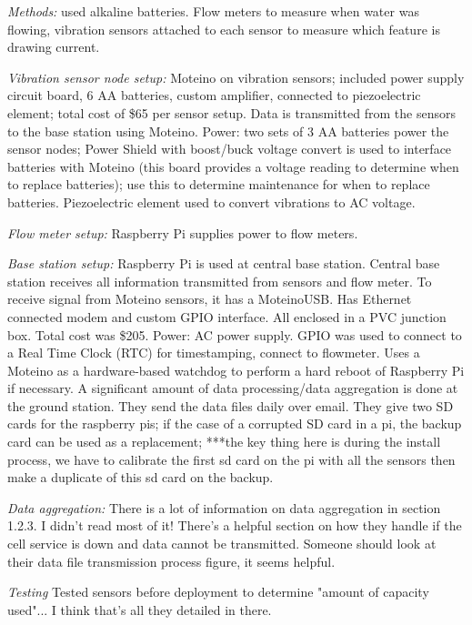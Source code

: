 \documentclass[12pt, letterpaper]{article}
\begin{document}
\textit{Methods:} used alkaline batteries. Flow meters to measure when water was flowing, vibration sensors attached to each
sensor to measure which feature is drawing current.
%

\textit{Vibration sensor node setup:} Moteino on vibration sensors; included power supply circuit board, 6 AA batteries,
custom amplifier, connected to piezoelectric element; total cost of \$65 per sensor setup. Data is transmitted from
the sensors to the base station using Moteino.
%
Power: two sets of 3 AA batteries power the sensor nodes; Power Shield with boost/buck voltage convert is used
to interface batteries with Moteino (this board provides a voltage reading to determine when to replace batteries);
use this to determine maintenance for when to replace batteries.
%
Piezoelectric element used to convert vibrations to AC voltage.

\textit{Flow meter setup:} Raspberry Pi supplies power to flow meters.
%

\textit{Base station setup:} Raspberry Pi is used at central base station.
%
Central base station receives all information transmitted from sensors and flow meter.
%
To receive signal from Moteino sensors, it has a MoteinoUSB.
%
Has Ethernet connected modem and custom GPIO interface.
%
All enclosed in a PVC junction box.
%
Total cost was \$205.
%
Power: AC power supply.
%
GPIO was used to connect to a Real Time Clock (RTC) for timestamping, connect to flowmeter.
%
Uses a Moteino as a hardware-based watchdog to perform a hard reboot of Raspberry Pi if necessary.
%
A significant amount of data processing/data aggregation is done at the ground station.
%
They send the data files daily over email.
%
They give two SD cards for the raspberry pis; if the case of a corrupted SD card in a pi, the backup
card can be used as a replacement; ***the key thing here is during the install process, we have to
calibrate the first sd card on the pi with all the sensors then make a duplicate of this sd card
on the backup.

\textit{Data aggregation:} There is a lot of information on data aggregation in section 1.2.3.
%
I didn't read most of it!
%
There's a helpful section on how they handle if the cell service is down and data cannot be transmitted.
%
Someone should look at their data file transmission process figure, it seems helpful.

\textit{Testing} Tested sensors before deployment to determine "amount of capacity used"...
%
I think that's all they detailed in there.
\end{document}
